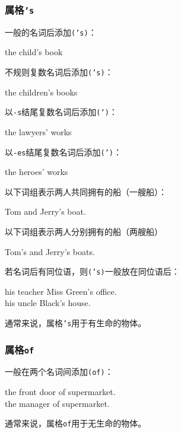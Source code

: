 \documentclass[UTF8]{ctexart}
\begin{document}
\subsubsection{属格\texttt{'s}}
    一般的名词后添加\texttt{('s)}：
    \begin{center}
        \ttfamily
        the child's book\\[6mm]
    \end{center}
    不规则复数名词后添加\texttt{('s)}：
    \begin{center}
        \ttfamily
        the children's books\\[6mm]
    \end{center}
    以\texttt{-s\hphantom{e}\hspace{2pt}}结尾复数名词后添加\texttt{(')}：
    \begin{center}
        \ttfamily
        the lawyers' works\\[6mm]
    \end{center}
    以\texttt{-es\hspace{2pt}}结尾复数名词后添加\texttt{(')}：
    \begin{center}
        \ttfamily
        the heroes' works\\[6mm]
    \end{center}
    以下词组表示两人共同拥有的船（一艘船）：
    \begin{center}
        \ttfamily
        Tom and Jerry's boat.\\[6mm]
    \end{center}
    以下词组表示两人分别拥有的船（两艘船）
    \begin{center}
        \ttfamily
        Tom's and Jerry's boats.\\[6mm]
    \end{center}
    若名词后有同位语，则\texttt{('s)}一般放在同位语后：
    \begin{center}
        \ttfamily
        his teacher Miss Green's office.\\[3mm]
        his uncle Black's house.\\[6mm]
    \end{center}
    通常来说，属格\texttt{\hspace{2pt}'s}用于有生命的物体。

\subsubsection{属格\texttt{\hspace{3pt}of}}
    一般在两个名词间添加\texttt{\hspace{3pt}(of)}：
    \begin{center}
        \ttfamily
        the front door of supermarket.\\[3mm]
        the manager of supermarket.\\[6mm]
    \end{center}
    通常来说，属格\texttt{\hspace{3pt}of}用于无生命的物体。
\end{document}

